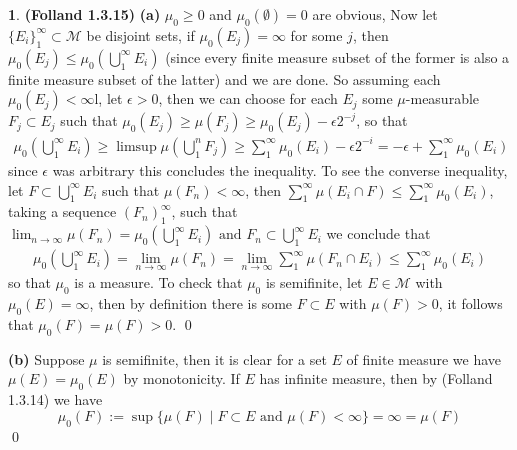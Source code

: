\documentclass[10.5pt]{article}
\theoremstyle{definition}
\newtheorem{pb}{}
\newcommand{\set}[1]{\{#1\}}
\newcommand{\tand}{\text{ and }}
\begin{document}
    \begin{pb}\textbf{(Folland 1.3.15)}
        \textbf{(a)} \(\mu_0 \geq 0\) and \(\mu_0(\emptyset) = 0\) are obvious, Now let \(\set{E_i}_1^\infty \subset \mathcal{M}\) be disjoint sets, if \(\mu_0(E_j) = \infty\) for some \(j\), then \(\mu_0(E_j) \leq \mu_0(\bigcup_1^\infty E_i)\) (since every finite measure subset of the former is also a finite measure subset of the latter) and we are done. So assuming each \(\mu_0(E_j) < \infty\)l, let \(\epsilon > 0\), then we can choose for each \(E_j\) some \(\mu\)-measurable \(F_j \subset E_j\) such that \(\mu_0(E_j) \geq \mu(F_j) \geq \mu_0(E_j) - \epsilon2^{-j}\), so that
        \begin{align*}
            \mu_0(\bigcup_1^\infty E_i) \geq \limsup \mu(\bigcup_1^n F_j) \geq \sum_1^\infty \mu_0(E_i) - \epsilon2^{-i} = -\epsilon + \sum_1^\infty \mu_0(E_i)
        \end{align*}
        since \(\epsilon\) was arbitrary this concludes the inequality. To see the converse inequality, let \(F \subset \bigcup_1^\infty E_i\) such that \(\mu(F_n) < \infty\), then \(\sum_1^\infty \mu(E_i \cap F) \leq \sum_1^\infty \mu_0(E_i)\), taking a sequence \((F_n)_1^\infty\), such that \(\lim_{n\to\infty}\mu(F_n) = \mu_0(\bigcup_1^\infty E_i) \tand F_n \subset \bigcup_1^\infty E_i\) we conclude that
        \begin{align*}
            \mu_0(\bigcup_1^\infty E_i) = \lim_{n\to\infty}\mu(F_n) = \lim_{n\to\infty}\sum_1^\infty \mu(F_n \cap E_i) \leq \sum_1^\infty \mu_0(E_i)
        \end{align*} so that \(\mu_0\) is a measure. To check that \(\mu_0\) is semifinite, let \(E \in \mathcal{M}\) with \(\mu_0(E) = \infty\), then by definition there is some \(F \subset E\) with \(\mu(F) > 0\), it follows that \(\mu_0(F) = \mu(F) > 0\). \qed

        \textbf{(b)} Suppose \(\mu\) is semifinite, then it is clear for a set \(E\) of finite measure we have \(\mu(E) = \mu_0(E)\) by monotonicity. If \(E\) has infinite measure, then by (Folland 1.3.14) we have \[\mu_0(F) := \sup\set{\mu(F) \mid F \subset E \tand \mu(F) < \infty} = \infty = \mu(F)\]
        \qed


\end{pb}
\end{document}
